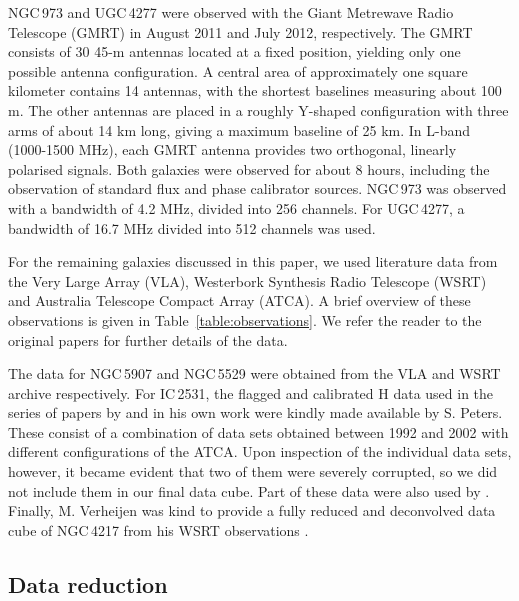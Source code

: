 \documentclass{aa}
\begin{document}
NGC\,973 and UGC\,4277 were observed with the Giant Metrewave Radio Telescope (GMRT) in August 2011 and July 2012, respectively. The GMRT consists of 30 45-m antennas located at a fixed position, yielding only one possible antenna configuration. A central area of approximately one square kilometer contains 14 antennas, with the shortest baselines measuring about 100 m. The other antennas are placed in a roughly Y-shaped configuration with three arms of about 14 km long, giving a maximum baseline of 25 km. In L-band (1000-1500 MHz), each GMRT antenna provides two orthogonal, linearly polarised signals. Both galaxies were observed for about 8 hours, including the observation of standard flux and phase calibrator sources. NGC\,973 was observed with a bandwidth of 4.2 MHz, divided into 256 channels. For UGC\,4277, a bandwidth of 16.7 MHz divided into 512 channels was used.
\par
For the remaining galaxies discussed in this paper, we used literature data from the Very Large Array (VLA), Westerbork Synthesis Radio Telescope (WSRT) and Australia Telescope Compact Array (ATCA). A brief overview of these observations is given in Table~\ref{table:observations}. We refer the reader to the original papers for further details of the data.
\par
The data for NGC\,5907 and NGC\,5529 were obtained from the VLA and WSRT archive respectively. For IC\,2531, the flagged and calibrated H{} data used in the series of papers by \cite{obrien10a,obrien10b,obrien10c,obrien10d} and in his own work \citep{peters13} were kindly made available by S. Peters. These consist of a combination of data sets obtained between 1992 and 2002 with different configurations of the ATCA. Upon inspection of the individual data sets, however, it became evident that two of them were severely corrupted, so we did not include them in our final data cube. Part of these data were also used by \cite{kregel04,kregel04b}. Finally, M. Verheijen was kind to provide a fully reduced and deconvolved data cube of NGC\,4217 from his WSRT observations \citep{verheijen01}. 


\subsection{Data reduction}
\label{sec:datareduction}
\end{document}
